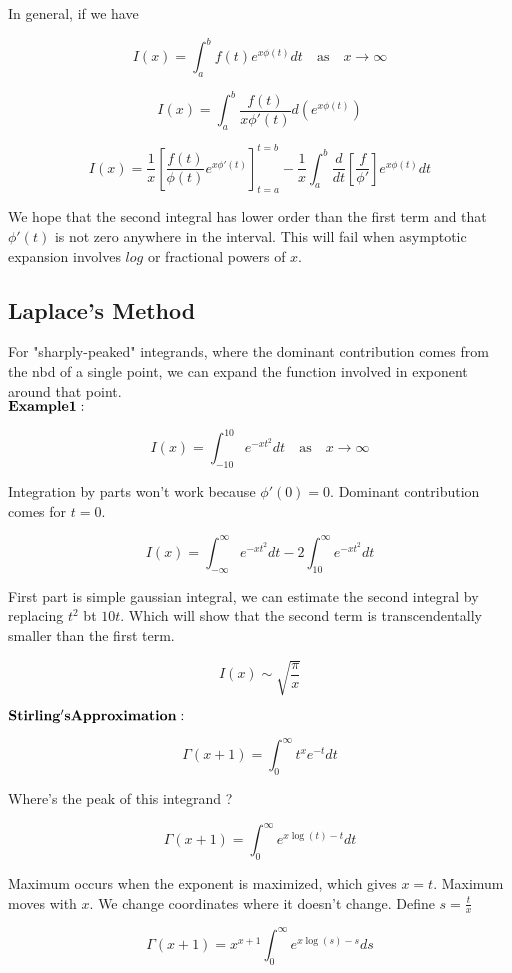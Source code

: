 \documentclass{report}
\begin{document}
\noindent In general, if we have

$$I(x) = \int_{a}^{b} f(t) e^{x\phi(t)} dt \quad\mathrm{as}\quad x\to\infty$$ 

$$I(x) = \int_{a}^{b} \frac{f(t)}{x\phi'(t)} d(e^{x\phi(t)})$$

$$I(x) = \frac{1}{x} \left[\frac{f(t)}{\phi(t)} e^{x\phi'(t)}\right]_{t=a}^{t=b} - \frac{1}{x}\int_{a}^{b}\frac {d}{dt}\left[\frac{f}{\phi'}\right]e^{x\phi(t)}dt $$

We hope that the second integral has lower order than the first term and that $\phi'(t)$ is not zero anywhere in the interval. This will fail when asymptotic expansion involves $log$ or fractional powers of $x$.

\subsection{Laplace's Method}

For "sharply-peaked" integrands, where the dominant contribution comes from the nbd of a single point, we can expand the function involved in exponent around that point.\\

\noindent $\bold{Example 1 :}$

$$ I(x) = \int_{-10}^{10}e^{-xt^2}dt \quad\mathrm{as}\quad x\to\infty$$

\noindent Integration by parts won't work because $\phi'(0) = 0$. Dominant contribution comes for $t=0$. 

$$I(x) = \int_{-\infty}^{\infty}e^{-xt^2}dt - 2\int_{10}^{\infty}e^{-xt^2}dt$$

\noindent First part is simple gaussian integral, we can estimate the second integral by replacing $t^2$ bt $10t$. Which will show that the second term is transcendentally smaller than the first term.

$$I(x) \sim \sqrt{\frac{\pi}{x}}$$

\noindent $\bold{Stirling's Approximation :}$

$$\Gamma(x+1) = \int_{0}^{\infty}t^x e^{-t}dt$$

\noindent Where's the peak of this integrand ? 

$$ \Gamma(x+1) = \int_{0}^{\infty}e^{x\log(t)-t}dt$$

\noindent Maximum occurs when the exponent is maximized, which gives $x = t$. Maximum moves with $x$. We change coordinates where it doesn't change. Define $ s = \frac{t}{x}$

$$\Gamma(x+1) = x^{x+1}\int_{0}^{\infty}e^{x\log(s) - s}ds$$
\end{document}
